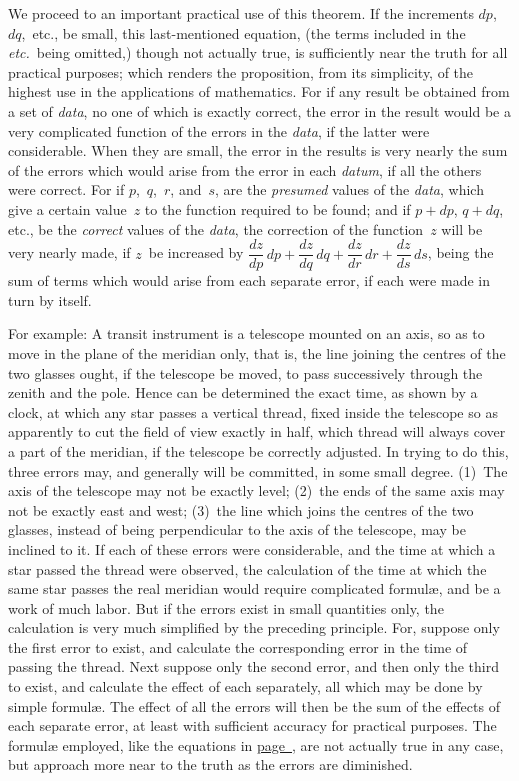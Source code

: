\documentclass[12pt]{book}[2005/09/16]
\newcommand{\Pagelabel}[1]{\phantomsection\label{page:#1}}
\newcommand{\PageSep}[1]{\Pagelabel{#1}\ignorespaces}
\newcommand{\PageRef}[2][page]{\hyperref[page:#2]{#1~\pageref*{page:#2}}}
\renewcommand{\(}{{\upshape(}}
\renewcommand{\)}{{\upshape)}}
\begin{document}
We proceed to an important practical use of this
%
theorem. If the increments $dp$,~$dq$,~etc., be small,
this last-mentioned equation, (the terms included in
the \emph{etc.}\ being omitted,) though not actually true, is
sufficiently near the truth for all practical purposes;
which renders the proposition, from its simplicity, of
the highest use in the applications of mathematics.
For if any result be obtained from a set of \textit{data}, no
one of which is exactly correct, the error in the result
would be a very complicated function of the errors in
the \textit{data}, if the latter were considerable. When they
are small, the error in the results is very nearly the
sum of the errors which would arise from the error in
each \textit{datum}, if all the others were correct. For if $p$,~$q$,~$r$,
and~$s$, are the \emph{presumed} values of the \textit{data}, which
give a certain value~$z$ to the function required to be
found; and if $p + dp$, $q + dq$, etc., be the \emph{correct} values
of the \textit{data}, the correction of the function~$z$ will be
very nearly made, if $z$~be increased by $\dfrac{dz}{dp}\, dp + \dfrac{dz}{dq}\, dq + \dfrac{dz}{dr}\, dr + \dfrac{dz}{ds}\, ds$,
being the sum of terms which would
arise from each separate error, if each were made in
turn by itself.

For example: A transit instrument is a telescope
%
mounted on an axis, so as to move in the plane of the
meridian only, that is, the line joining the centres of
the two glasses ought, if the telescope be moved, to
pass successively through the zenith and the pole.
Hence can be determined the exact time, as shown by
a clock, at which any star passes a vertical thread,
\PageSep{85}
fixed inside the telescope so as apparently to cut the
field of view exactly in half, which thread will always
cover a part of the meridian, if the telescope be correctly
adjusted. In trying to do this, three errors
may, and generally will be committed, in some small
degree. (1)~The axis of the telescope may not be exactly
level; (2)~the ends of the same axis may not be
exactly east and west; (3)~the line which joins the
centres of the two glasses, instead of being perpendicular
to the axis of the telescope, may be inclined
to it. If each of these errors were considerable, and
the time at which a star passed the thread were observed,
the calculation of the time at which the same
star passes the real meridian would require complicated
formulæ, and be a work of much labor. But if
the errors exist in small quantities only, the calculation
is very much simplified by the preceding principle.
For, suppose only the first error to exist, and
calculate the corresponding error in the time of passing
the thread. Next suppose only the second error,
and then only the third to exist, and calculate the
effect of each separately, all which may be done by
simple formulæ. The effect of all the errors will then
be the sum of the effects of each separate error, at
least with sufficient accuracy for practical purposes.
The formulæ employed, like the equations in \PageRef{28},
are not actually true in any case, but approach more
near to the truth as the errors are diminished.
\end{document}
